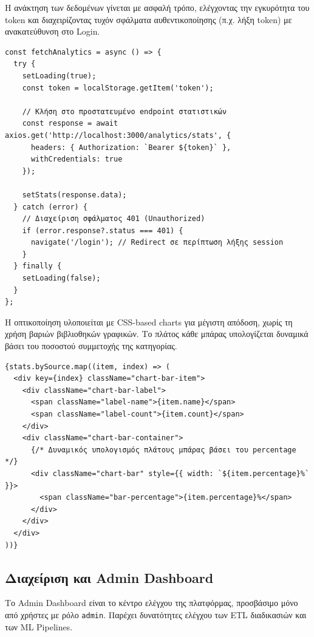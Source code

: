 \documentclass[a4paper,12pt]{article}
\begin{document}
Η ανάκτηση των δεδομένων γίνεται με ασφαλή τρόπο, ελέγχοντας την εγκυρότητα του token και διαχειρίζοντας τυχόν σφάλματα αυθεντικοποίησης (π.χ. λήξη token) με ανακατεύθυνση στο Login.

\begin{verbatim}
const fetchAnalytics = async () => {
  try {
    setLoading(true);
    const token = localStorage.getItem('token');
    
    // Κλήση στο προστατευμένο endpoint στατιστικών
    const response = await axios.get('http://localhost:3000/analytics/stats', {
      headers: { Authorization: `Bearer ${token}` },
      withCredentials: true 
    });
    
    setStats(response.data);
  } catch (error) {
    // Διαχείριση σφάλματος 401 (Unauthorized)
    if (error.response?.status === 401) {
      navigate('/login'); // Redirect σε περίπτωση λήξης session
    }
  } finally {
    setLoading(false);
  }
};
\end{verbatim}

Η οπτικοποίηση υλοποιείται με CSS-based charts για μέγιστη απόδοση, χωρίς τη χρήση βαριών βιβλιοθηκών γραφικών. Το πλάτος κάθε μπάρας υπολογίζεται δυναμικά βάσει του ποσοστού συμμετοχής της κατηγορίας.

\begin{verbatim}
{stats.bySource.map((item, index) => (
  <div key={index} className="chart-bar-item">
    <div className="chart-bar-label">
      <span className="label-name">{item.name}</span>
      <span className="label-count">{item.count}</span>
    </div>
    <div className="chart-bar-container">
      {/* Δυναμικός υπολογισμός πλάτους μπάρας βάσει του percentage */}
      <div className="chart-bar" style={{ width: `${item.percentage}%` }}>
        <span className="bar-percentage">{item.percentage}%</span>
      </div>
    </div>
  </div>
))}
\end{verbatim}

\subsection{Διαχείριση και Admin Dashboard}

Το Admin Dashboard είναι το κέντρο ελέγχου της πλατφόρμας, προσβάσιμο μόνο από χρήστες με ρόλο \texttt{admin}. Παρέχει δυνατότητες ελέγχου των ETL διαδικασιών και των ML Pipelines.
\end{document}
